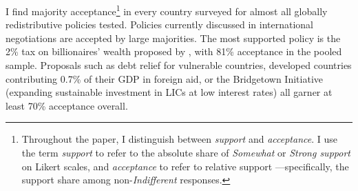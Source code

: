 \documentclass[12pt,english]{article}
\begin{document}


I find majority acceptance\footnote{Throughout the paper, I distinguish between \textit{support} and \textit{acceptance}. I use the term \textit{support} to refer to the absolute share of \textit{Somewhat} or \textit{Strong support} on Likert scales, and \textit{acceptance} to refer to relative support ---specifically, the support share among non-\textit{Indifferent} responses.} in every country surveyed for almost all globally redistributive policies tested. Policies currently discussed in international negotiations are accepted by large majorities. The most supported %
policy is the 2\% tax on billionaires' wealth proposed by \cite{zucman_blueprint_2024}, with 81\% acceptance in the pooled sample. Proposals such as debt relief for vulnerable countries, developed countries contributing 0.7\% of their GDP in foreign aid, %
or the Bridgetown Initiative (expanding sustainable investment in LICs at low interest rates) all garner at least 70\% acceptance overall. 
\end{document}

